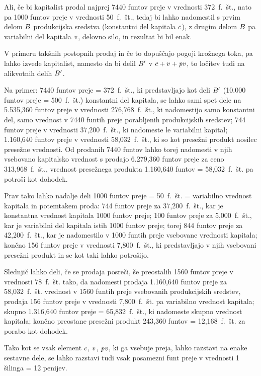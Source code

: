 \documentclass[kapital_02.tex]{subfiles}
\begin{document}
Ali, če bi kapitalist prodal najprej 7440 funtov preje v vrednosti 372~f.~št., nato pa 1000 funtov preje v vrednosti 50~f.~št., tedaj bi lahko nadomestil s prvim delom \( B \) produkcijska sredstva (konstantni del kapitala \( c \)), z drugim delom \( B \) pa variabilni del kapitala \( v \), delovno silo, in rezultat bi bil enak.

V primeru takšnih postopnih prodaj in če to dopuščajo pogoji krožnega toka, pa lahko izvede kapitalist, namesto da bi delil \( B' \) v \( c +  v + \mathit{pv} \), to ločitev tudi na alikvotnih delih \( B' \).

Na primer: 7440 funtov preje = 372~f.~št., ki predstavljajo kot deli \( B' \) (10.000 funtov preje = 500~f.~št.) konstantni del kapitala, se lahko sami spet dele na 5.535,360 funtov preje v vrednosti 276,768~f.~št., ki nadomestijo samo konstantni del, samo vrednost v 7440 funtih preje porabljenih produkcijskih sredstev; 744 funtov preje v vrednosti 37,200~f.~št., ki nadomeste le variabilni kapital; 1.160,640 funtov preje v vrednosti 58,032~f.~št., ki so kot presežni produkt nosilec presežne vrednosti. Od prodanih 7440 funtov lahko torej nadomesti v njih vsebovano kapitalsko vrednost s prodajo 6.279,360 funtov preje za ceno 313,968~f.~št., vrednost presežnega produkta 1.160,640 funtov = 58,032~f.~št. pa potroši kot dohodek.

Prav tako lahko nadalje deli 1000 funtov preje = 50~f.~št. = variabilno vrednost kapitala in potemtakem proda: 744 funtov preje za 37,200~f.~št., kar je konstantna vrednost kapitala 1000 funtov preje; 100 funtov preje za 5,000~f.~št., kar je variabilni del kapitala istih 1000 funtov preje; torej 844 \KPEstran funtov preje za 42,200~f.~št., kar je nadomestilo v 1000 funtih preje vsebovane vrednosti kapitala; končno 156 funtov preje v vrednosti 7,800~f.~št., ki predstavljajo v njih vsebovani presežni produkt in se kot taki lahko potrošijo.

Slednjič lahko deli, če se prodaja posreči, še preostalih 1560 funtov preje v vrednosti 78~f.~št. tako, da nadomesti prodaja 1.160,640 funtov preje za 58,032~f.~št. vrednost v 1560 funtih preje vsebovanih produkcijskih sredstev, prodaja 156 funtov preje v vrednosti 7,800~f.~št. pa variabilno vrednost kapitala; skupno 1.316,640 funtov preje = 65,832~f.~št., ki nadomeste skupno vrednost kapitala; končno preostane presežni produkt 243,360 funtov = 12,168~f.~št. za porabo kot dohodek.

Tako kot se vsak element \( c \), \( v \), \( \mathit{pv} \), ki ga vsebuje preja, lahko razstavi na enake sestavne dele, se lahko razstavi tudi vsak posamezni funt preje v vrednosti 1 šilinga = 12 penijev.
\end{document}
